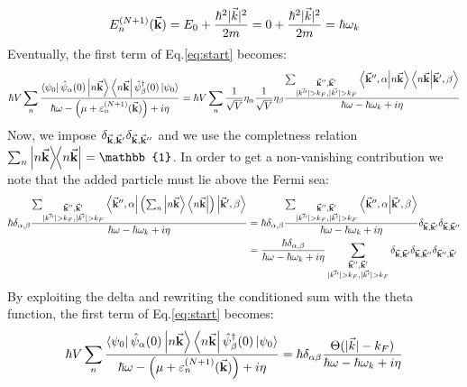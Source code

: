 \documentclass[11pt, a4paper, twoside, openright]{article}
\begin{document}
\begin{equation*}
  E_n^{(N+1)} (\va{k}) = E_0 + \frac{\hbar^2 | \vec{k} |^2 }{2m} = 0 + \frac{\hbar^2 | \vec{k} |^2 }{2m} = \hbar \omega _k
\end{equation*}
Eventually, the first term of Eq.\eqref{eq:start} becomes:
\begin{equation*}
\begin{split}
 \hbar V \sum_{n}^{}
  \frac{
  \bra{\psi _0} \hat{\psi }_ \alpha
   (0) \ket{ n \va{k}} \bra{n \va{k}} \hat{\psi }_ \beta ^\dag (0) \ket{\psi _0}
   }{ \hbar \omega - \qty( \mu + \varepsilon _n^{(N+1)}(\va{k})) + i \eta }
   = \hbar V \sum_{n}^{}
   \frac{1}{\sqrt{V} } \eta _ \alpha
   \frac{1}{\sqrt{V} } \eta _ \beta \frac{
      \sum_{\substack{\va{k}'', \va{k}' \\ | \vec{k''} | > k_F, | \vec{k'} | > k_F  } }^{}  \braket{\va{k}'', \alpha  }{n \va{k}}
      \braket{n \va{k}}{\va{k}', \beta }
    }{ \hbar \omega - \hbar \omega _k + i \eta}
\end{split}
\end{equation*}
Now, we impose \( \delta _{\va{k},\va{k}'} \delta _{\va{k},\va{k}''} \) and we use the completness relation \( \sum_{n}^{} \ketbra{n \va{k}}{n \va{k}}  = \mathbb{1}  \). In order to get a non-vanishing contribution we note that the added particle must lie above the Fermi sea:
\begin{equation*}
\begin{split}
 \hbar
  \delta _{\alpha,\beta  } \frac{
      \sum_{\substack{\va{k}'', \va{k}' \\ | \vec{k''} | > k_F, | \vec{k'} | > k_F  } }^{}  \bra{\va{k}'', \alpha  } \qty( \sum_{n}^{} \ket{n \va{k}}
      \bra{n \va{k}} ) \ket{\va{k}', \beta }
    }{ \hbar \omega - \hbar \omega _k + i \eta}
   &=
    \hbar
     \delta _{\alpha,\beta  } \frac{
         \sum_{\substack{\va{k}'', \va{k}' \\ | \vec{k''} | > k_F, | \vec{k'} | > k_F  } }^{}  \bra{\va{k}'', \alpha  } \ket{\va{k}', \beta }
       }{ \hbar \omega - \hbar \omega _k + i \eta}
       \delta _{\va{k},\va{k}'} \delta _{\va{k},\va{k}''} \\
  &=
   \frac{\hbar
    \delta _{\alpha,\beta  }
     }{ \hbar \omega - \hbar \omega _k + i \eta}
     \sum_{\substack{\va{k}'', \va{k}' \\ | \vec{k''} | > k_F, | \vec{k'} | > k_F  } }^{}
     \delta _{\va{k},\va{k}'} \delta _{\va{k},\va{k}''} \delta _{\va{k}'',\va{k}'}
\end{split}
\end{equation*}
By exploiting the delta and rewriting the conditioned sum with the theta function, the first term of Eq.\eqref{eq:start} becomes:
\begin{equation}
  \hbar V \sum_{n}^{}
   \frac{
   \bra{\psi _0} \hat{\psi }_ \alpha
    (0) \ket{ n \va{k}} \bra{n \va{k}} \hat{\psi }_ \beta ^\dag (0) \ket{\psi _0}
    }{ \hbar \omega - \qty( \mu + \varepsilon _n^{(N+1)}(\va{k})) + i \eta }
    = \hbar \delta _{\alpha \beta } \frac{\Theta (| \vec{k} | - k_F )}{\hbar \omega - \hbar \omega _k + i \eta}
    \label{eq:first_term}
\end{equation}
\end{document}
